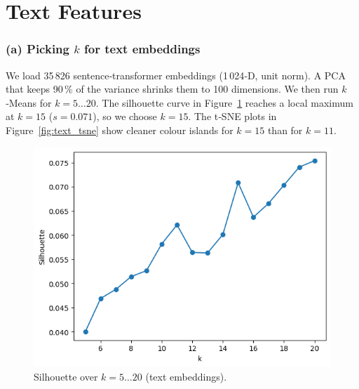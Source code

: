 \documentclass{article}
\begin{document}
\maketitle



\section{Text Features}

\subsubsection{(a) Picking $k$ for text embeddings}
We load 35\,826 sentence‑transformer embeddings (1\,024‑D, unit norm). A PCA that keeps 90\,\% of the variance shrinks them to 100 dimensions. We then run $k$‑Means for $k=5\ldots20$. The silhouette curve in Figure~\ref{fig:text_silhouette} reaches a local maximum at $k=15$ ($s=0.071$), so we choose \textbf{$k=15$}. The t‑SNE plots in Figure~\ref{fig:text_tsne} show cleaner colour islands for $k=15$ than for $k=11$.

\begin{figure}[h]
  \centering
  \includegraphics[width=.55\linewidth]{figs_tang/04_silhouette_k.png}
  \caption{Silhouette over $k=5\ldots20$ (text embeddings).}
  \label{fig:text_silhouette}
\end{figure}
\end{document}
